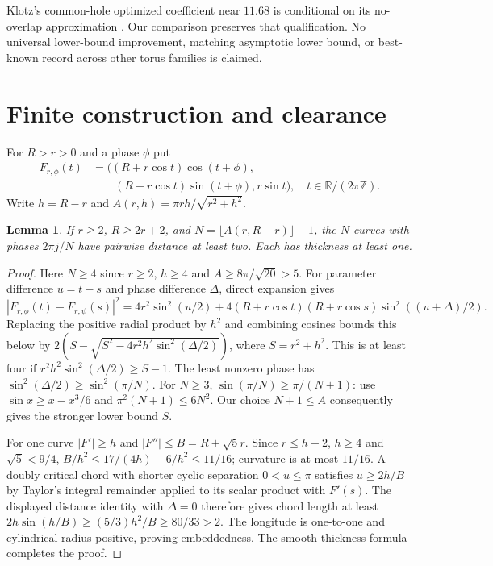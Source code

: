 \documentclass[11pt]{article}
\newtheorem{lemma}[theorem]{Lemma}
\begin{document}
Klotz's common-hole optimized coefficient near $11.68$ is conditional on its
no-overlap approximation \cite{klotz26}. Our comparison preserves that
qualification. No universal lower-bound improvement, matching asymptotic
lower bound, or best-known record across other torus families is claimed.

\section{Finite construction and clearance}
For $R>r>0$ and a phase $\phi$ put
\begin{equation}\label{curve}
\begin{aligned}
F_{r,\phi}(t)&=((R+r\cos t)\cos(t+\phi),\\
 &\qquad (R+r\cos t)\sin(t+\phi),r\sin t),\quad
 t\in\mathbb R/(2\pi\mathbb Z).
\end{aligned}
\end{equation}
Write $h=R-r$ and $A(r,h)=\pi rh/\sqrt{r^2+h^2}$.

\begin{lemma}\label{same}
If $r\ge2$, $R\ge2r+2$, and $N=\lfloor A(r,R-r)\rfloor-1$,
the $N$ curves with phases $2\pi j/N$ have pairwise distance at least two.
Each has thickness at least one.
\end{lemma}
\begin{proof}
Here $N\ge4$ since $r\ge2$, $h\ge4$ and $A\ge8\pi/\sqrt{20}>5$.
For parameter difference $u=t-s$ and phase difference $\Delta$, direct
expansion gives
\[
 |F_{r,\phi}(t)-F_{r,\psi}(s)|^2
 =4r^2\sin^2(u/2)+4(R+r\cos t)(R+r\cos s)
                  \sin^2((u+\Delta)/2).
\]
Replacing the positive radial product by $h^2$ and combining cosines bounds
this below by $2(S-\sqrt{S^2-4r^2h^2\sin^2(\Delta/2)})$, where
$S=r^2+h^2$. This is at least four if
$r^2h^2\sin^2(\Delta/2)\ge S-1$. The least nonzero phase has
$\sin^2(\Delta/2)\ge\sin^2(\pi/N)$. For $N\ge3$,
$\sin(\pi/N)\ge\pi/(N+1)$: use
$\sin x\ge x-x^3/6$ and $\pi^2(N+1)\le6N^2$.
Our choice $N+1\le A$ consequently gives the stronger lower bound $S$.

For one curve $|F'|\ge h$ and $|F''|\le B=R+\sqrt5r$.
Since $r\le h-2$, $h\ge4$ and $\sqrt5<9/4$,
$B/h^2\le17/(4h)-6/h^2\le11/16$; curvature is at most $11/16$.
A doubly critical chord with shorter cyclic separation $0<u\le\pi$
satisfies $u\ge2h/B$ by Taylor's integral remainder applied to its scalar
product with $F'(s)$. The displayed distance identity with $\Delta=0$
therefore gives chord length at least
$2h\sin(h/B)\ge(5/3)h^2/B\ge80/33>2$.
The longitude is one-to-one and cylindrical radius positive, proving
embeddedness. The smooth thickness formula completes the proof.
\end{proof}
\end{document}
